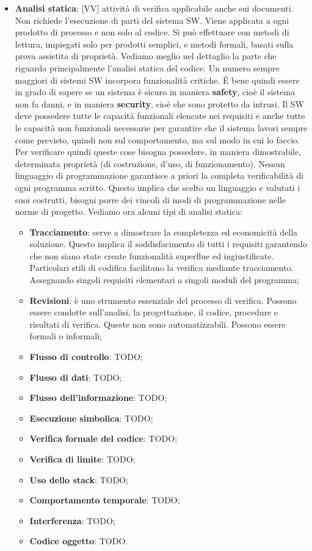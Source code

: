 \begin{itemize}
		\item \textbf{Analisi statica}: [VV] attività di verifica applicabile anche sui documenti. Non richiede l'esecuzione di parti del sistema SW. Viene applicata a ogni prodotto di processo e non solo al codice. Si può effettuare con metodi di lettura, impiegati solo per prodotti semplici, e metodi formali, basati sulla prova assistita di proprietà. Vediamo meglio nel dettaglio la parte che riguarda principalmente l'analisi statica del codice. \newline
		Un numero sempre maggiori di sistemi SW incorpora funzionalità critiche. \'E bene quindi essere in grado di sapere se un sistema è sicuro in maniera \textbf{safety}, cioè il sistema non fa danni, e in maniera \textbf{security}, cioè che sono protetto da intrusi. Il SW deve possedere tutte le capacità funzionali elencate nei requisiti e anche tutte le capacità non funzionali necessarie per garantire che il sistema lavori sempre come previsto, quindi non sul comportamento, ma sul modo in cui lo faccio. Per verificare quindi queste cose bisogna possedere, in maniera dimostrabile, determinata proprietà (di costruzione, d'uso, di funzionamento). \newline
		Nessun linguaggio di programmazione garantisce a priori la completa verificabilità di ogni programma scritto. Questo implica che scelto un linguaggio e valutati i suoi costrutti, bisogni porre dei vincoli di modi di programmazione nelle norme di progetto. Vediamo ora alcuni tipi di analisi statica:
			\begin{itemize}
				\item \textbf{Tracciamento}: serve a dimostrare la completezza ed economicità della soluzione. Questo implica il soddisfacimento di tutti i requisiti garantendo che non siano state create funzionalità superflue ed ingiustificate. Particolari stili di codifica facilitano la verifica mediante tracciamento. Assegnando singoli requisiti elementari a singoli moduli del programma;
				\item \textbf{Revisioni}: è uno strumento essenziale del processo di verifica. Possono essere condotte sull'analisi, la progettazione, il codice, procedure e risultati di verifica. Queste non sono automatizzabili. Possono essere formali o informali;
				\item \textbf{Flusso di controllo}: TODO;
				\item \textbf{Flusso di dati}: TODO;
				\item \textbf{Flusso dell'informazione}: TODO;
				\item \textbf{Esecuzione simbolica}: TODO;
				\item \textbf{Verifica formale del codice}: TODO;
				\item \textbf{Verifica di limite}: TODO;
				\item \textbf{Uso dello stack}: TODO;
				\item \textbf{Comportamento temporale}: TODO;
				\item \textbf{Interferenza}: TODO;
				\item \textbf{Codice oggetto}: TODO.
			\end{itemize}





\end{itemize}
